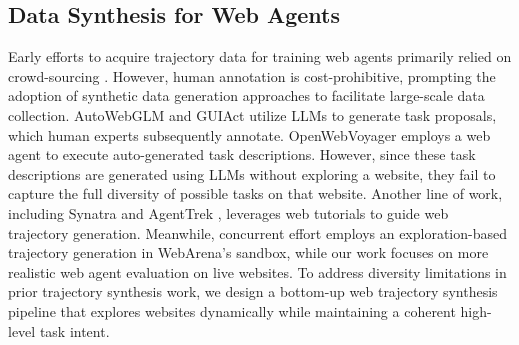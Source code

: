 

\subsection{Data Synthesis for Web Agents}
Early efforts to acquire trajectory data for training web agents primarily relied on crowd-sourcing \cite{mind2web, DBLP:conf/icml/LuKR24}.
However, human annotation is cost-prohibitive, prompting the adoption of synthetic data generation approaches to facilitate large-scale data collection.
AutoWebGLM \cite{DBLP:conf/kdd/LaiLIYCSYZZD024} and GUIAct \cite{chen2024guicourse} utilize LLMs to generate task proposals, which human experts subsequently annotate.
OpenWebVoyager \cite{he2024openwebvoyager} employs a web agent to execute auto-generated task descriptions. 
However, since these task descriptions are generated using LLMs without exploring a website, they fail to capture the full diversity of possible tasks on that website.
Another line of work, including Synatra \cite{Ou2024SynatraTI} and AgentTrek \cite{xu2024agenttrek}, leverages web tutorials to guide web trajectory generation.
Meanwhile, concurrent effort \cite{murty2024nnetscape} employs an exploration-based trajectory generation in WebArena’s sandbox, while our work focuses on more realistic web agent evaluation on live websites.
To address diversity limitations in prior trajectory synthesis work, we design a bottom-up web trajectory synthesis pipeline that explores websites dynamically while maintaining a coherent high-level task intent.